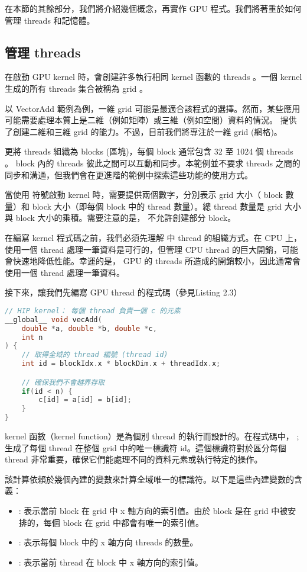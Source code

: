 在本節的其餘部分，我們將介紹幾個概念，再實作 GPU 程式。我們將著重於如何管理 threads 和記憶體。

\subsection{管理 threads}
在啟動 GPU kernel 時，會創建許多執行相同 kernel 函數的 threads 。一個 kernel 生成的所有 threads 集合被稱為 grid 。

以 VectorAdd 範例為例，一維 grid 可能是最適合該程式的選擇。然而，某些應用可能需要處理本質上是二維（例如矩陣）或三維（例如空間）資料的情況。 提供了創建二維和三維 grid 的能力。不過，目前我們將專注於一維 grid (網格)。

 更將 threads 組織為 blocks (區塊)，每個 block 通常包含 32 至 1024 個 threads 。 block 內的 threads 彼此之間可以互動和同步。本範例並不要求 threads 之間的同步和溝通，但我們會在更進階的範例中探索這些功能的使用方式。

當使用 \code{<<<>>>} 符號啟動 kernel 時，需要提供兩個數字，分別表示 grid 大小（ block 數量）和 block 大小（即每個 block 中的 thread 數量）。總 thread 數量是 grid 大小與 block 大小的乘積。需要注意的是，  不允許創建部分 block。

在編寫 kernel 程式碼之前，我們必須先理解  中 thread 的組織方式。在 CPU 上，使用一個 thread 處理一筆資料是可行的，但管理 CPU thread 的巨大開銷，可能會快速地降低性能。幸運的是， GPU 的 threads 所造成的開銷較小，因此通常會使用一個 thread 處理一筆資料。

接下來，讓我們先編寫 GPU thread 的程式碼（參見Listing 2.3）

\begin{lstlisting}[language=C, caption={Vector\_add GPU kernel}, label={3rd:example}]
// HIP kernel： 每個 thread 負責一個 c 的元素
__global__ void vecAdd(
    double *a, double *b, double *c,
    int n
) {
    // 取得全域的 thread 編號 (thread id)
    int id = blockIdx.x * blockDim.x + threadIdx.x;

    // 確保我們不會越界存取
    if(id < n) {
        c[id] = a[id] = b[id];
    }
}
\end{lstlisting}

kernel 函數（kernel function）是為個別 thread 的執行而設計的。在程式碼中， ; 生成了每個 thread 在整個 grid 中的唯一標識符 id。這個標識符對於區分每個 thread 非常重要，確保它們能處理不同的資料元素或執行特定的操作。

該計算依賴於幾個內建的變數來計算全域唯一的標識符。以下是這些內建變數的含義：
\begin{itemize}
    \item {}: 表示當前 block 在 grid 中 x 軸方向的索引值。由於 block 是在 grid 中被安排的，每個 block 在 grid 中都會有唯一的索引值。
    \item {}: 表示每個 block 中的 x 軸方向 threads 的數量。
    \item {}: 表示當前 thread 在 block 中 x 軸方向的索引值。
\end{itemize}

